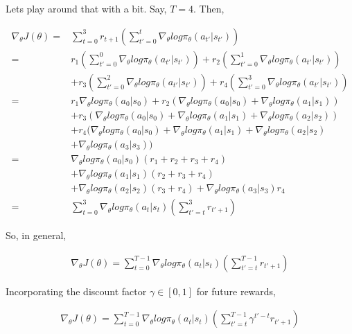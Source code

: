 \documentclass[letterpaper,11pt]{article}
\begin{document}
Lets play around that with a bit. 
Say, $T = 4$. Then,

$$
\begin{aligned}
    \nabla_{\theta} J(\theta) ={}& \sum\limits_{t=0}^{3} r_{t+1} (\sum\limits_{t'=0}^{t} \nabla_{\theta} log \pi_{\theta}(a_{t'} | s_{t'})) \\ ={}& r_{1} (\sum\limits_{t'=0}^{0} \nabla_{\theta} log \pi_{\theta}(a_{t'} | s_{t'})) + r_{2} (\sum\limits_{t'=0}^{1} \nabla_{\theta} log \pi_{\theta}(a_{t'} | s_{t'})) \\
& + r_{3} (\sum\limits_{t'=0}^{2} \nabla_{\theta} log \pi_{\theta}(a_{t'} | s_{t'})) + r_{4} (\sum\limits_{t'=0}^{3} \nabla_{\theta} log \pi_{\theta}(a_{t'} | s_{t'})) \\ ={}& r_{1} \nabla_{\theta} log \pi_{\theta} (a_{0} | s_{0}) + r_{2} (\nabla_{\theta} log \pi_{\theta} (a_{0} | s_{0}) + \nabla_{\theta} log \pi_{\theta} (a_{1} | s_{1})) \\
& + r_{3}  (\nabla_{\theta} log \pi_{\theta} (a_{0} | s_{0}) + \nabla_{\theta} log \pi_{\theta} (a_{1} | s_{1}) + \nabla_{\theta} log \pi_{\theta} (a_{2} | s_{2})) \\ & + r_{4} (\nabla_{\theta} log \pi_{\theta} (a_{0} | s_{0}) + \nabla_{\theta} log \pi_{\theta} (a_{1} | s_{1}) + \nabla_{\theta} log \pi_{\theta} (a_{2} | s_{2}) \\
& + \nabla_{\theta} log \pi_{\theta} (a_{3} | s_{3})) \\ ={}&  \nabla_{\theta} log \pi_{\theta} (a_{0} | s_{0}) (r_{1} + r_{2} + r_{3} + r_{4}) \\
 & + \nabla_{\theta} log \pi_{\theta} (a_{1} | s_{1}) (r_{2} + r_{3} + r_{4}) \\ & + \nabla_{\theta} log \pi_{\theta} (a_{2} | s_{2}) (r_{3} + r_{4}) + \nabla_{\theta} log \pi_{\theta} (a_{3} | s_{3}) r_{4} \\ ={}& \sum\limits_{t=0}^{3} \nabla_{\theta} log \pi_{\theta} (a_{t} | s_{t}) (\sum\limits_{t'=t}^{3} r_{t'+1}) 
\end{aligned}
$$

So, in general, 

$$
\begin{aligned}
\nabla_{\theta}J(\theta) = \sum\limits_{t=0}^{T-1} \nabla_{\theta} log \pi_{\theta} (a_{t} | s_{t}) (\sum\limits_{t'=t}^{T-1} r_{t'+1}) 
\end{aligned}
$$

Incorporating the discount factor $\gamma \in [0,1]$ for future rewards,

$$
\begin{aligned}
    \nabla_{\theta}J(\theta) = \sum\limits_{t=0}^{T-1} \nabla_{\theta} log \pi_{\theta} (a_{t} | s_{t}) (\sum\limits_{t'=t}^{T-1} \gamma^{t'-t} r_{t'+1}) 
\end{aligned}
$$
\end{document}
